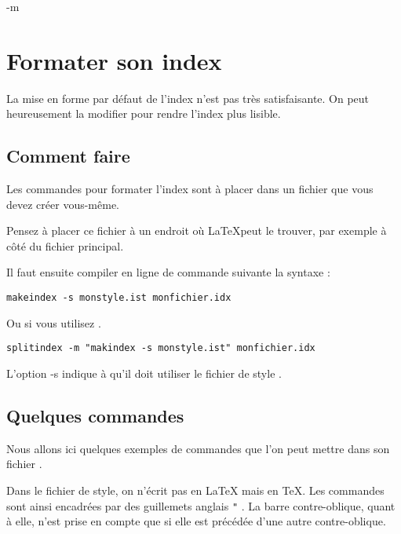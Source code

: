 -m\chapter{Formater son index}\label{styleindex}

\begin{prealable}
La mise en forme par défaut de l'index n'est pas très satisfaisante. On peut heureusement la modifier pour rendre l'index plus lisible.
\end{prealable}

\section{Comment faire}
Les commandes pour formater l'index sont à placer dans un fichier  que vous devez créer vous-même.

\begin{attention}
Pensez à placer ce fichier à un endroit où \LaTeX peut le trouver, par exemple à côté du fichier principal.
\end{attention}

Il faut ensuite compiler en ligne de commande suivante la syntaxe :
\begin{verbatim}
makeindex -s monstyle.ist monfichier.idx
\end{verbatim}

Ou si vous utilisez .

\begin{verbatim}
splitindex -m "makindex -s monstyle.ist" monfichier.idx
\end{verbatim}

L'option -s indique à   qu'il doit utiliser le fichier de style .

\section{Quelques commandes}

Nous allons ici quelques exemples de commandes que l'on peut mettre dans son fichier . 

\begin{attention}
Dans le fichier de style, on n'écrit pas en \LaTeX{} mais en \TeX . Les commandes sont ainsi encadrées par des guillemets anglais \verb|"| . La barre contre-oblique, quant à elle, n'est prise en compte que si elle est précédée d'une autre contre-oblique.
\end{attention}

